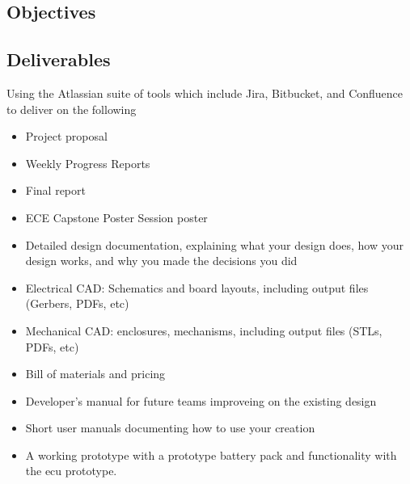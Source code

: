\subsection{Objectives}



\subsection{Deliverables}

Using the Atlassian suite of tools which include Jira, Bitbucket, and Confluence to deliver on the following

\begin{itemize}
	\item Project proposal
	\item Weekly Progress Reports
	\item Final report
	\item ECE Capstone Poster Session poster
	\item Detailed design documentation, explaining what your design does, how your design works, and why you made the decisions you did
	\item Electrical CAD: Schematics and board layouts, including output files (Gerbers, PDFs, etc)
	\item Mechanical CAD: enclosures, mechanisms, including output files (STLs, PDFs, etc)
	\item Bill of materials and pricing
	\item Developer's manual for future teams improveing on the existing design
	\item Short user manuals documenting how to use your creation
	\item A working prototype with a prototype battery pack and functionality with the \gls{ecu} prototype.
\end{itemize}